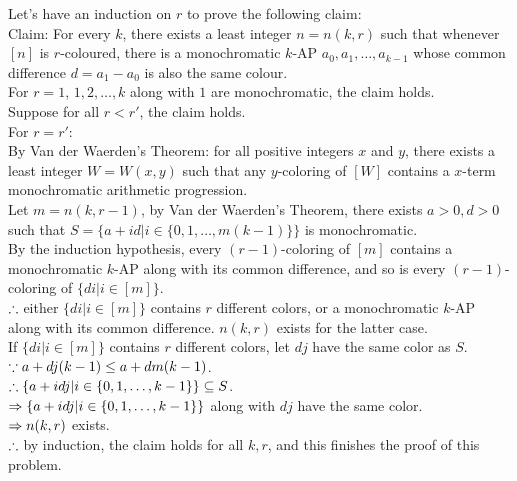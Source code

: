 \setcounter{pr}{0}
\begin{pr}
Let's have an induction on $r$ to prove the following claim:\\
Claim: For every $k$, there exists a least integer $n=n(k, r)$ such that whenever $[n]$ is $r$-coloured, there is a monochromatic $k$-AP $a_0, a_1, \dots, a_{k-1}$ whose common difference $d=a_1-a_0$ is also the same colour.\\
For $r=1$, $1, 2, \dots, k$ along with $1$ are monochromatic, the claim holds.\\
Suppose for all $r<r'$, the claim holds.\\
For $r=r'$:\\
By Van der Waerden's Theorem: for all positive integers $x$ and $y$, there exists a least integer $W=W(x, y)$ such that any $y$-coloring of $[W]$ contains a $x$-term monochromatic arithmetic progression.\\
Let $m=n(k, r-1)$, by Van der Waerden's Theorem, there exists $a>0, d>0$ such that $S=\{a+id|i\in\{0, 1, \dots, m(k-1)\}\}$ is monochromatic.\\
By the induction hypothesis, every $(r-1)$-coloring of $[m]$ contains a monochromatic $k$-AP along with its common difference, and so is every $(r-1)$-coloring of $\{di|i\in[m]\}$.\\
$\therefore$ either $\{di|i\in[m]\}$ contains $r$ different colors, or a monochromatic $k$-AP along with its common difference. $n(k, r)$ exists for the latter case.\\
If $\{di|i\in[m]\}$ contains $r$ different colors, let $dj$ have the same color as $S$.\\
$\because a+dj(k-1)\leq a+dm(k-1)$.\\
$\therefore\{a+idj|i\in\{0, 1, \dots, k-1\}\}\subseteq S$.\\
$\Rightarrow\{a+idj|i\in\{0, 1, \dots, k-1\}\}$ along with $dj$ have the same color.\\
$\Rightarrow n(k, r)$ exists.\\
$\therefore$ by induction, the claim holds for all $k, r$, and this finishes the proof of this problem.
\end{pr}
